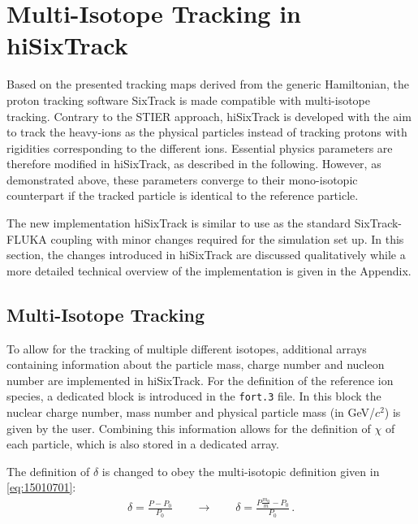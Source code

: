 \section{Multi-Isotope Tracking in hiSixTrack}

Based on the presented tracking maps derived from the generic Hamiltonian, the proton tracking software SixTrack is made compatible with multi-isotope tracking. Contrary to the STIER approach, hiSixTrack is developed with the aim to track the heavy-ions as the physical particles instead of tracking protons with rigidities corresponding to the different ions. Essential physics parameters are therefore modified in hiSixTrack, as described in the following. However, as demonstrated above, these parameters converge to their mono-isotopic counterpart if the tracked particle is identical to the reference particle. 

The new implementation hiSixTrack is similar to use as the standard SixTrack-FLUKA coupling with minor changes required for the simulation set up. In this section, the changes introduced in hiSixTrack are discussed qualitatively while a more detailed technical overview of the implementation is given in the Appendix. 



\subsection{Multi-Isotope Tracking}

To allow for the tracking of multiple different isotopes, additional arrays containing information about the particle mass, charge number and nucleon number are implemented in hiSixTrack. For the definition of the reference ion species, a dedicated block is introduced in the \texttt{fort.3} file. In this block the nuclear charge number, mass number and physical particle mass (in GeV/$c^2$) is given by the user. Combining this information allows for the definition of $\chi$ of each particle, which is also stored in a dedicated array. 

The definition of $\delta$ is changed to obey the multi-isotopic definition given in \eqref{eq:15010701}:
%
\begin{align}
  \delta = \frac{P - P_0}{P_0}\quad \quad  \rightarrow \quad \quad \delta = \frac{P \frac{m_0}{m} - P_0}{P_0} \, .
\end{align}


